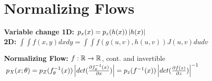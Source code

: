 \section{Normalizing Flows}

\textbf{Variable change 1D:} $p_x(x) = p_z(h(x)) \left\lvert h(x) \right\rvert$\\
\textbf{2D:} $\int \int f(x,y) dxdy = \int \int f(g(u,v), h(u,v)) J(u,v) dudv$\\

\textbf{Normalizing Flow:} $f: \mathbb{R} \rightarrow \mathbb{R}$, cont. and invertible\\
$p_X(x; \theta) = p_Z(f_\theta^{-1}(x)) \left\lvert det(\frac{\partial f_\theta^{-1}(x)}{\partial x}) \right\rvert
= p_z(f^{-1}(x)) \left\lvert det(\frac{\partial f(z)}{\partial z}) \right\rvert^{-1}$\\


